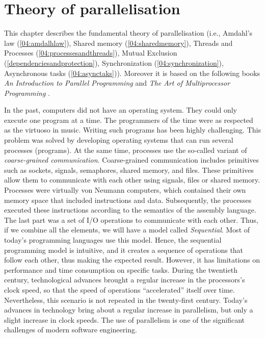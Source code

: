 \chapter{Theory of parallelisation}
\label{03:chapter:title}

This chapter describes the fundamental theory of parallelisation (i.e., Amdahl's law (\ref{04:amdalhlaw}), Shared memory (\ref{04:sharedmemory}), Threads and Processes (\ref{04:processesandthreads}), Mutual Exclusion (\ref{dependenciesandprotection}), Synchronization (\ref{04:synchronization}), Asynchronous tasks (\ref{04:asynctaks})).
Moreover it is based on the following books \emph{An Introduction to Parallel Programming} \cite{introductionToParallelProgramming} and \emph{The Art of Multiprocessor Programming} \cite{artOfMultiprocessorProgramming}.

In the past, computers did not have an operating system.
They could only execute one program at a time.
The programmers of the time were as respected as the virtuoso in music.
Writing such programs has been highly challenging.
This problem was solved by developing operating systems that can run several processes (programs).
At the same time, processes use the so-called variant of \emph{coarse-grained communication}.
Coarse-grained communication includes primitives such as sockets, signals, semaphores, shared memory, and files.
These primitives allow them to communicate with each other using signals, files or shared memory.
Processes were virtually von Neumann computers, which contained their own memory space that included instructions and data.
Subsequently, the processes executed these instructions according to the semantics of the assembly language.
The last part was a set of I/O operations to communicate with each other.
Thus, if we combine all the elements, we will have a model called \emph{Sequential}.
Most of today's programming languages use this model.
Hence, the sequential programming model is intuitive, and it creates a sequence of operations that follow each other, thus making the expected result.
However, it has limitations on performance and time consumption on specific tasks.
During the twentieth century, technological advances brought a regular increase in the processors's clock speed, so that the speed of operations ``accelerated'' itself over time.
Nevertheless, this scenario is not repeated in the twenty-first century.
Today's advances in technology bring about a regular increase in parallelism, but only a slight increase in clock speeds.
The use of parallelism is one of the significant challenges of modern software engineering.

